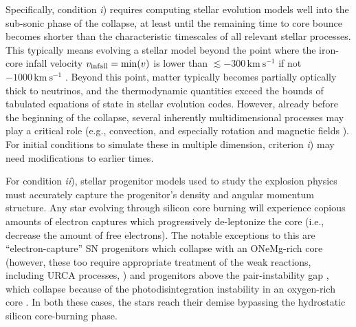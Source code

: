 \documentclass[%
trackchanges,twocolumn]{aastex701}
\begin{document}
Specifically, condition \emph{i}) requires computing stellar evolution
models well into the sub-sonic phase of the collapse, at least until
the remaining time to core bounce becomes shorter than the
characteristic timescales of all relevant stellar processes. This
typically means evolving a stellar model beyond the point where the
iron-core infall velocity $v_{\rm infall} = \min(v)$ is lower than
$\lesssim -300\,\mathrm{km\ s^{-1}}$ \citep[e.g.,][]{farmer:21,
  farmer:23, gottlieb:24} if not $-1000\,\mathrm{km\ s^{-1}}$
\citep[e.g.,][]{woosley:02}. Beyond this point, matter typically
becomes partially optically thick to neutrinos, and the thermodynamic
quantities exceed the bounds of tabulated equations of state in
stellar evolution codes. However, already before the beginning
  of the collapse, several inherently multidimensional processes may
  play a critical role (e.g., convection, and especially rotation and
  magnetic fields \citealt{yadav:20, fields:22, chen:26}). For initial
  conditions to simulate these in multiple dimension, criterion
  \emph{i}) may need modifications to earlier times.

For condition \emph{ii}), stellar progenitor models used to study the
explosion physics must accurately capture the progenitor's density and
angular momentum structure. Any star evolving through silicon core
burning will experience copious amounts of electron captures
\cite[e.g.,][]{arnett:77,hix:93,hix:99,grichener:25, myers:26} which
progressively de-leptonize the core (i.e., decrease the amount of free
electrons). The notable exceptions to this are ``electron-capture'' SN
progenitors which collapse with an ONeMg-rich core (however, these too
require appropriate treatment of the weak reactions, including URCA
processes, \citealt{nomoto:84, takahashi:13, jones:14, zha:19}) and
progenitors above the pair-instability gap \citep[e.g.,][]{rakavy:67,
  renzo:24}, which collapse because of the photodisintegration
instability in an oxygen-rich core \citep[e.g.,][]{bond:84,
  gottlieb:25}. In both these cases, the stars reach their demise
bypassing the hydrostatic silicon core-burning phase.
\end{document}
